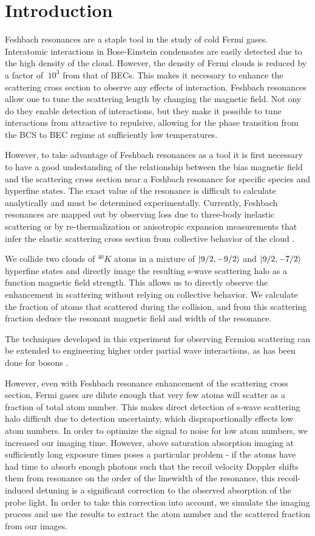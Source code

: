 \documentclass[12pt]{iopart}
\begin{document}
\section{Introduction}
Feshbach resonances are a staple tool in the study of cold Fermi gases. Interatomic interactions in Bose-Einstein condensates are easily detected due to the high density of the cloud. However, the density of Fermi clouds is reduced by a factor of $~10^3$ from that of BECs. This makes it necessary to enhance the scattering cross section to observe any effects of interaction. Feshbach resonances allow one to tune the scattering length by changing the magnetic field. Not ony do they enable detection of interactions, but they make it possible to tune interactions from attractive to repulsive, allowing for the phase transition from the BCS to BEC regime at sufficiently low temperatures. 
\par However, to take advantage of Feshbach resonances as a tool it  is first necessary to have a good undestanding of the relationship between the bias magnetic field and the scattering cross section near a Feshbach resonance for specific species and hyperfine states.  The exact value of the resonance is difficult to calculate analytically and must be determined experimentally. Currently, Feshbach resonances are mapped out by observing loss due to three-body inelastic scattering or by re-thermalization or anisotropic expansion measurements that infer the elastic scattering cross section from collective behavior of the cloud \cite{Regal03,OHara02,Monroe93}. 
\par We collide two clouds of $^{40}K$ atoms in a mixture of $\mathinner{|{9/2,-9/2}\rangle}$ and $\mathinner{|{9/2,-7/2}\rangle}$ hyperfine states and directly image the resulting s-wave scattering halo as a function magnetic field strength. This allows us to directly observe the enhancement in scattering without relying on collective behavior. We calculate the fraction of atoms that scattered during the collision, and from this scattering fraction deduce the resonant magnetic field  and width of the resonance.
\par The techniques developed in this experiment for observing Fermion scattering can be extended to engineering higher order partial wave interactions, as has been done for bosons \cite{Williams2012}.
\par However, even with Feshbach resonance enhancement of the scattering cross section, Fermi gases are dilute enough that very few atoms will scatter as a fraction of total atom number. This makes direct detection of s-wave scattering halo difficult due to detection uncertainty, which dispraportionally effects low atom numbers. In order to optimize the signal to noise for low atom numbers, we increased our imaging time.  However, above saturation absorption imaging at sufficiently long exposure times poses a particular problem - if the atoms have had time to absorb enough photons such that the recoil velocity Doppler shifts them from resonance on the order of the linewidth of the resonance, this recoil-induced detuning is a significant correction to the observed absorption of the probe light. In order to take this correction into account, we simulate the imaging process and use the results to extract the atom number and the scattered fraction from our images.
\end{document}
